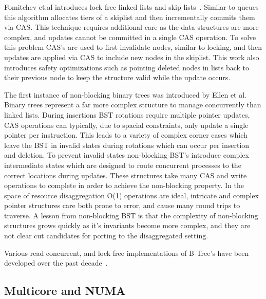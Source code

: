 Fomitchev et.al introduces lock free linked lists and skip
lists~\cite{lock-free-skip}. Similar to queues this algorithm allocates tiers of
a skiplist and then incrementally commits them via CAS. This technique requires
additional care as the data structures are more complex, and updates cannot be
committed in a single CAS operation. To solve this problem CAS's are used to
first invalidate nodes, similar to locking, and then updates are applied via CAS
to include new nodes in the skiplist. This work also introduces safety
optimizations such as pointing deleted nodes in lists back to their previous
node to keep the structure valid while the update occurs.

The first instance of non-blocking binary trees was introduced by Ellen et al.
Binary trees represent a far more complex structure to manage concurrently than
linked lists. During insertions BST rotations require multiple pointer updates,
CAS operations can typically, due to spacial constraints, only update a single
pointer per instruction. This leads to a variety of complex corner cases which
leave the BST in invalid states during rotations which can occur per insertion
and deletion. To prevent invalid states non-blocking BST's introduce complex
intermediate states which are designed to route concurrent processes to the
correct locations during updates. These structures take many CAS and write
operations to complete in order to achieve the non-blocking property. In the
space of resource disaggregation O(1) operations are ideal, intricate and
complex pointer structures care both prone to error, and cause many round trips
to traverse. A lesson from non-blocking BST is that the complexity of
non-blocking structures grows quickly as it's invariants become more complex,
and they are not clear cut candidates for porting to the disaggregated setting.

Various read concurrent, and lock free implementations of B-Tree's have been
developed over the past decade~\cite{read-concur-btree,lock-free-btree}.

\subsection{Multicore and NUMA}

